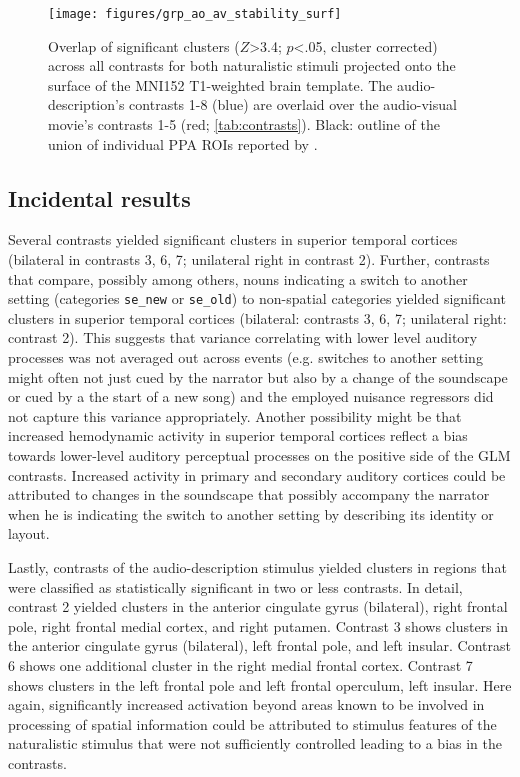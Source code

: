 \documentclass[english,11pt]{article}
\begin{document}
\begin{figure*}[tbp]
\centering
    \texttt{[image: figures/grp\_ao\_av\_stability\_surf]}
    \caption[NAME]
    {Overlap of significant clusters ($Z$>3.4; $p$<.05, cluster
    corrected) across all contrasts for both naturalistic stimuli projected
    onto the surface of the MNI152 T1-weighted brain template.
    The audio-description's contrasts 1-8 (blue) are overlaid over the
    audio-visual movie's contrasts 1-5 (red; \ref{tab:contrasts}).
    Black: outline of the union of individual PPA ROIs reported by
    \citet{sengupta2016extension}.
    }
    \label{fig:grp_ao_av_stability}
\end{figure*}


\subsection*{Incidental results}

Several contrasts yielded significant clusters in superior temporal cortices
(bilateral in contrasts 3, 6, 7; unilateral right in contrast 2).
Further, contrasts that compare, possibly among others, nouns indicating a
switch to another setting (categories \texttt{se\_new} or \texttt{se\_old}) to
non-spatial categories yielded significant clusters in superior temporal
cortices (bilateral: contrasts 3, 6, 7; unilateral right: contrast 2).
This suggests that variance correlating with lower level auditory processes was
not averaged out across events (e.g. switches to another setting might often not
just cued by the narrator but also by a change of the soundscape or cued by a
the start of a new song) and the employed nuisance regressors did not capture
this variance appropriately.
Another possibility might be that increased hemodynamic activity in superior
temporal cortices reflect a bias towards lower-level auditory perceptual
processes on the positive side of the GLM contrasts.
Increased activity in primary and secondary auditory cortices could be
attributed to changes in the soundscape that possibly accompany the narrator
when he is indicating the switch to another setting by describing its identity
or layout.

%
Lastly, contrasts of the audio-description stimulus yielded clusters
in regions that were classified as statistically significant in two or less contrasts.
In detail, contrast 2 yielded clusters in the anterior cingulate gyrus
(bilateral), right frontal pole, right frontal medial cortex, and right putamen.
Contrast 3 shows clusters in the anterior cingulate gyrus (bilateral), left
frontal pole, and left insular.
Contrast 6 shows one additional cluster in the right medial frontal cortex.
Contrast 7 shows clusters in the left frontal pole and left frontal operculum,
left insular.
Here again, significantly increased activation beyond areas known to be involved
in processing of spatial information could be attributed to stimulus features of
the naturalistic stimulus that were not sufficiently controlled leading to a
bias in the contrasts.
\end{document}

